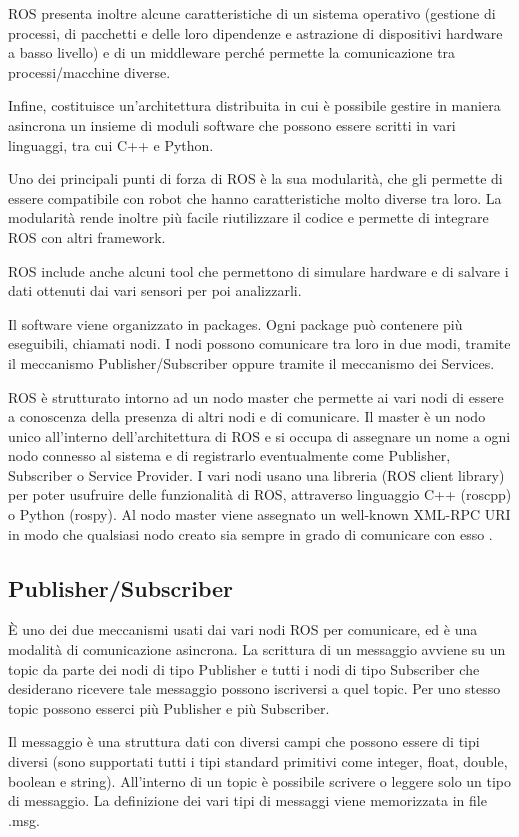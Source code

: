 \documentclass[Lau, binding=0.6cm, oneside]{sapthesis}
\begin{document}
ROS presenta inoltre alcune caratteristiche di un sistema operativo (gestione di processi, di pacchetti e delle loro dipendenze e astrazione di dispositivi hardware a basso livello) e di un middleware perché permette la comunicazione tra processi/macchine diverse.

Infine, costituisce un’architettura distribuita in cui è possibile gestire in maniera asincrona un insieme di moduli software che possono essere scritti in vari linguaggi, tra cui C++ e Python.

Uno dei principali punti di forza di ROS è la sua modularità, che gli permette di essere compatibile con robot che hanno caratteristiche molto diverse tra loro.
La modularità rende inoltre più facile riutilizzare il codice e permette di integrare ROS con altri framework.

ROS include anche alcuni tool che permettono di simulare hardware e di salvare i dati ottenuti dai vari sensori per poi analizzarli.

Il software viene organizzato in packages. Ogni package può contenere più eseguibili, chiamati nodi.
I nodi possono comunicare tra loro in due modi, tramite il meccanismo Publisher/Subscriber oppure tramite il meccanismo dei Services.

ROS è strutturato intorno ad un nodo master che permette ai vari nodi di essere a conoscenza della presenza di altri nodi e di comunicare.
Il master è un nodo unico all’interno dell’architettura di ROS e si occupa di assegnare un nome a ogni nodo connesso al sistema e di registrarlo eventualmente come Publisher, Subscriber o Service Provider.
I vari nodi usano una libreria (ROS client library) per poter usufruire delle funzionalità di ROS, attraverso linguaggio C++ (roscpp) o Python (rospy).
Al nodo master viene assegnato un well-known XML-RPC URI in modo che qualsiasi nodo creato sia sempre in grado di comunicare con esso \cite{fonte3}.

\subsection{Publisher/Subscriber}
È uno dei due meccanismi usati dai vari nodi ROS per comunicare, ed è una modalità di comunicazione asincrona.
La scrittura di un messaggio avviene su un topic da parte dei nodi di tipo Publisher e tutti i nodi di tipo Subscriber che desiderano ricevere tale messaggio possono iscriversi a quel topic.
Per uno stesso topic possono esserci più Publisher e più Subscriber.

Il messaggio è una struttura dati con diversi campi che possono essere di tipi diversi (sono supportati tutti i tipi standard primitivi come integer, float, double, boolean e string).
All’interno di un topic è possibile scrivere o leggere solo un tipo di messaggio.
La definizione dei vari tipi di messaggi viene memorizzata in file .msg.
\end{document}
